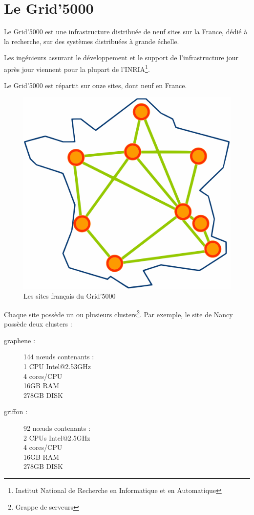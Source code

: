 \documentclass[12pt]{report}
\begin{document}
		\section{Le Grid'5000}
		Le Grid'5000 est une infrastructure distribuée de neuf sites sur la France, dédié à la recherche,
		sur des systèmes distribuées à grande échelle.

		Les ingénieurs assurant le développement et le support de l'infrastructure jour après jour viennent pour la plupart	de l'INRIA\footnote{Institut National de Recherche en Informatique et en Automatique}.

		Le Grid'5000 est répartit sur onze sites, dont neuf en France.

		\begin{figure}[H]
			\begin{center}
				\includegraphics[width=0.4\linewidth]{images/Site_map.png}
				\caption{Les sites français du Grid'5000}
			\end{center}
		\end{figure}

		Chaque site possède un ou plusieurs clusters\footnote{Grappe de serveurs}. Par exemple, le site de Nancy possède deux clusters :
		
		\begin{description}
			\item[graphene :] 144 nœuds contenants :\\
			1 CPU Intel@2.53GHz\\
			4 cores/CPU\\
			16GB RAM\\
			278GB DISK
			\item[griffon :] 92 nœuds contenants :\\
			2 CPUs Intel@2.5GHz\\
			4 cores/CPU\\
			16GB RAM\\
			278GB DISK
		\end{description}
\end{document}
